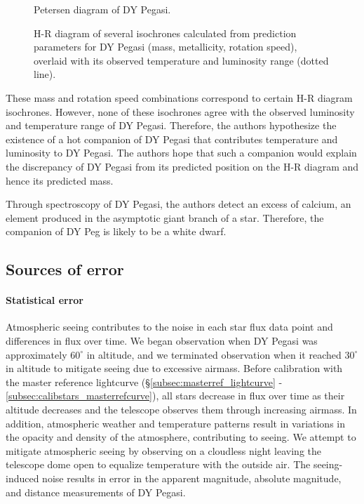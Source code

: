 \documentclass[twocolumn]{aastex631}
\newcommand{\degree}{^\circ}
\begin{document}
\begin{figure}
\caption{Petersen diagram of DY Pegasi. \citep{Xue_2020} \label{fig:petersen}}
\end{figure}

\begin{figure}
\caption{H-R diagram of several isochrones calculated from prediction parameters for DY Pegasi (mass, metallicity, rotation speed), overlaid with its observed temperature and luminosity range (dotted line). \citep{Xue_2020} \label{fig:xue2020_hrdiagram}}
\end{figure}

These mass and rotation speed combinations correspond to certain H-R diagram isochrones. However, none of these isochrones agree with the observed luminosity and temperature range of DY Pegasi. Therefore, the authors hypothesize the existence of a hot companion of DY Pegasi that contributes temperature and luminosity to DY Pegasi. The authors hope that such a companion would explain the discrepancy of DY Pegasi from its predicted position on the H-R diagram and hence its predicted mass.

Through spectroscopy of DY Pegasi, the authors detect an excess of calcium, an element produced in the asymptotic giant branch of a star. Therefore, the companion of DY Peg is likely to be a white dwarf.

\subsection{Sources of error}

\paragraph{Statistical error} Atmospheric seeing contributes to the noise in each star flux data point and differences in flux over time. We began observation when DY Pegasi was approximately $60\degree$ in altitude, and we terminated observation when it reached $30\degree$ in altitude to mitigate seeing due to excessive airmass. Before calibration with the master reference lightcurve (\S \ref{subsec:masterref_lightcurve} - \ref{subsec:calibstars_masterrefcurve}), all stars decrease in flux over time as their altitude decreases and the telescope observes them through increasing airmass. In addition, atmospheric weather and temperature patterns result in variations in the opacity and density of the atmosphere, contributing to seeing. We attempt to mitigate atmospheric seeing by observing on a cloudless night leaving the telescope dome open to equalize temperature with the outside air. The seeing-induced noise results in error in the apparent magnitude, absolute magnitude, and distance measurements of DY Pegasi.
\end{document}

